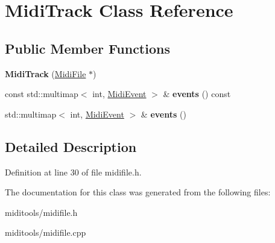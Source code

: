 \hypertarget{class_midi_track}{}\section{Midi\+Track Class Reference}
\label{class_midi_track}
\subsection*{Public Member Functions}
\begin{DoxyCompactItemize}
\item 
\mbox{\label{class_midi_track_a6ad9731fe6b6712793a152e70f9c1fc2}} 
{\bfseries Midi\+Track} (\hyperlink{class_midi_file}{Midi\+File} $\ast$)
\item 
\mbox{\label{class_midi_track_a76222c1f81dc484c4eec710556680fa4}} 
const std\+::multimap$<$ int, \hyperlink{class_midi_event}{Midi\+Event} $>$ \& {\bfseries events} () const
\item 
\mbox{\label{class_midi_track_a93d7d8f546bd289edf28344ed7bf18cd}} 
std\+::multimap$<$ int, \hyperlink{class_midi_event}{Midi\+Event} $>$ \& {\bfseries events} ()
\end{DoxyCompactItemize}


\subsection{Detailed Description}


Definition at line 30 of file midifile.\+h.



The documentation for this class was generated from the following files\+:\begin{DoxyCompactItemize}
\item 
miditools/midifile.\+h\item 
miditools/midifile.\+cpp\end{DoxyCompactItemize}
